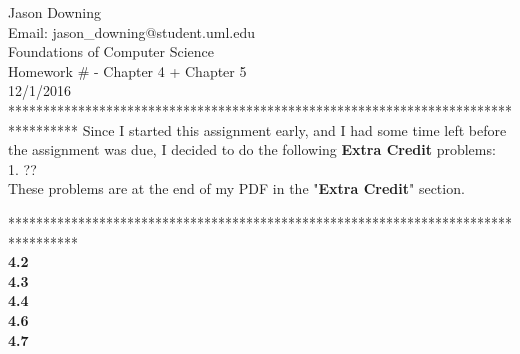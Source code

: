 \documentclass[12pt]{article}
\begin{document}
\noindent
Jason Downing \\
Email: jason\_downing@student.uml.edu \\
Foundations of Computer Science \\
Homework \# - Chapter 4 + Chapter 5 \\
12/1/2016 \\

**********************************************************************************
Since I started this assignment early, and I had some time left before the assignment
was due, I decided to do the following \textbf{Extra Credit} problems: \\

1. ?? \\

These problems are at the end of my PDF in the "\textbf{Extra Credit}" section.

********************************************************************************** \\

\pagebreak
\textbf{4.2} \\



\pagebreak
\textbf{4.3} \\



\pagebreak
\textbf{4.4} \\



\pagebreak
\textbf{4.6} \\



\pagebreak
\textbf{4.7} \\
\end{document}
